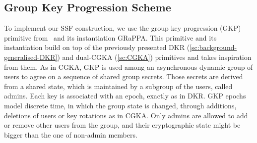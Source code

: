 \subsection{Group Key Progression Scheme}\label{sc:gkp-scheme}

To implement our SSF construction, we use the group key 
progression (GKP) primitive from~\cite{GKP} and its
instantiation GRaPPA.
This primitive and its instantiation build on top of the previously presented DKR
(\cref{sc:background-generalised-DKR}) and dual-CGKA (\cref{sc:CGKA}) primitives
and takes inspiration from them.
As in CGKA, GKP is used among an asynchronous dynamic group of users
to agree on a sequence of shared group secrets. Those secrets
are derived from a shared state, which is maintained by a
subgroup of the users, called admins. Each key is associated with
an epoch, exactly as in DKR. GKP epochs model
discrete time, in which the group state is changed, through
additions, deletions of users or key rotations as in CGKA.
Only admins are allowed to add or remove other users from the group,
and their cryptographic state might be bigger than the one of
non-admin members.

